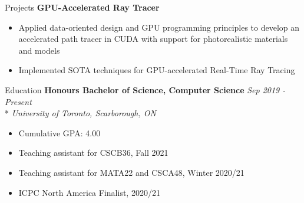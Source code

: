 \documentclass[11pt, letterpaper]{article}
\begin{document}
\begin{section}{Projects}
\textbf{GPU-Accelerated Ray Tracer}
\begin{itemize}
  \item Applied data-oriented design and GPU programming principles to develop an accelerated path tracer in CUDA with support for photorealistic materials and models
  \item Implemented SOTA techniques for GPU-accelerated Real-Time Ray Tracing
\end{itemize}

\end{section}

\begin{section}{Education}
\textbf{Honours Bachelor of Science, Computer Science}
\hfill
\textit{Sep 2019 - Present}\\*
\textit{University of Toronto, Scarborough, ON}
\begin{itemize}
  \item Cumulative GPA: 4.00
  \item Teaching assistant for CSCB36, Fall 2021
  \item Teaching assistant for MATA22 and CSCA48, Winter 2020/21
  \item ICPC North America Finalist, 2020/21
\end{itemize}

\end{section}
\end{document}
